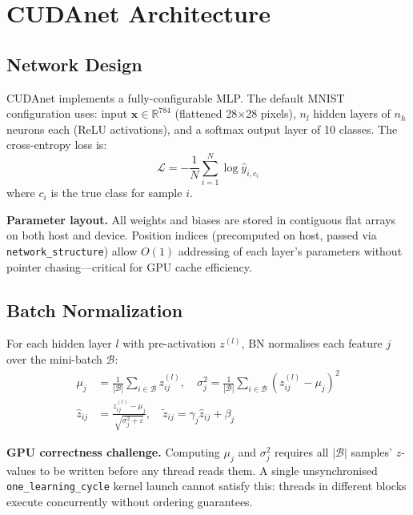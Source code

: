 \documentclass[conference]{IEEEtran}
\begin{document}
\section{CUDAnet Architecture}

\subsection{Network Design}

CUDAnet implements a fully-configurable MLP. The default MNIST configuration uses: input $\mathbf{x} \in \mathbb{R}^{784}$ (flattened 28$\times$28 pixels), $n_l$ hidden layers of $n_h$ neurons each (ReLU activations), and a softmax output layer of 10 classes. The cross-entropy loss is:
\begin{equation}
\mathcal{L} = -\frac{1}{N} \sum_{i=1}^{N} \log \hat{y}_{i,c_i}
\end{equation}
where $c_i$ is the true class for sample $i$.

\textbf{Parameter layout.} All weights and biases are stored in contiguous flat arrays on both host and device. Position indices (precomputed on host, passed via \texttt{network\_structure}) allow $O(1)$ addressing of each layer's parameters without pointer chasing—critical for GPU cache efficiency.

\subsection{Batch Normalization}

For each hidden layer $l$ with pre-activation $z^{(l)}$, BN normalises each feature $j$ over the mini-batch $\mathcal{B}$:
\begin{align}
\mu_j &= \frac{1}{|\mathcal{B}|}\sum_{i \in \mathcal{B}} z_{ij}^{(l)}, \quad
\sigma_j^2 = \frac{1}{|\mathcal{B}|}\sum_{i \in \mathcal{B}} (z_{ij}^{(l)} - \mu_j)^2 \\
\hat{z}_{ij} &= \frac{z_{ij}^{(l)} - \mu_j}{\sqrt{\sigma_j^2 + \varepsilon}}, \quad
\tilde{z}_{ij} = \gamma_j \hat{z}_{ij} + \beta_j
\end{align}

\textbf{GPU correctness challenge.} Computing $\mu_j$ and $\sigma_j^2$ requires all $|\mathcal{B}|$ samples' $z$-values to be written before any thread reads them. A single unsynchronised \texttt{one\_learning\_cycle} kernel launch cannot satisfy this: threads in different blocks execute concurrently without ordering guarantees.
\end{document}
